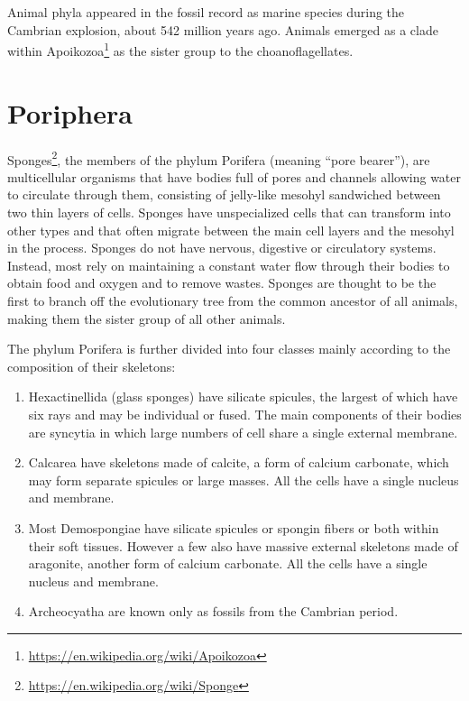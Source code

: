 \documentclass[]{book}
\providecommand{\tightlist}{%
  \setlength{\itemsep}{0pt}\setlength{\parskip}{0pt}}
\let\rmarkdownfootnote\footnote%
\def\footnote{\protect\rmarkdownfootnote}
\renewcommand{\href}[2]{#2\footnote{\url{#1}}}
\theoremstyle{definition}
\theoremstyle{definition}
\theoremstyle{definition}
\theoremstyle{remark}
\begin{document}
Animal phyla appeared in the fossil record as marine species during the
Cambrian explosion, about 542 million years ago. Animals emerged as a
clade within \href{https://en.wikipedia.org/wiki/Apoikozoa}{Apoikozoa} as the sister group to the choanoflagellates.

\section{Poriphera}\label{poriphera}

\href{https://en.wikipedia.org/wiki/Sponge}{Sponges}, the members of the
phylum Porifera (meaning ``pore bearer''), are multicellular organisms
that have bodies full of pores and channels allowing water to circulate
through them, consisting of jelly-like mesohyl sandwiched between two
thin layers of cells. Sponges have unspecialized cells that can
transform into other types and that often migrate between the main cell
layers and the mesohyl in the process. Sponges do not have nervous,
digestive or circulatory systems. Instead, most rely on maintaining a
constant water flow through their bodies to obtain food and oxygen and
to remove wastes. Sponges are thought to be the first to branch off the
evolutionary tree from the common ancestor of all animals, making them
the sister group of all other animals.

The phylum Porifera is further divided into four classes mainly
according to the composition of their skeletons:

\begin{enumerate}
\def\labelenumi{\arabic{enumi}.}
\tightlist
\item
  Hexactinellida (glass sponges) have silicate spicules, the largest of
  which have six rays and may be individual or fused. The main
  components of their bodies are syncytia in which large numbers of cell
  share a single external membrane.
\item
  Calcarea have skeletons made of calcite, a form of calcium carbonate,
  which may form separate spicules or large masses. All the cells have a
  single nucleus and membrane.
\item
  Most Demospongiae have silicate spicules or spongin fibers or both
  within their soft tissues. However a few also have massive external
  skeletons made of aragonite, another form of calcium carbonate. All
  the cells have a single nucleus and membrane.
\item
  Archeocyatha are known only as fossils from the Cambrian period.
\end{enumerate}
\end{document}
